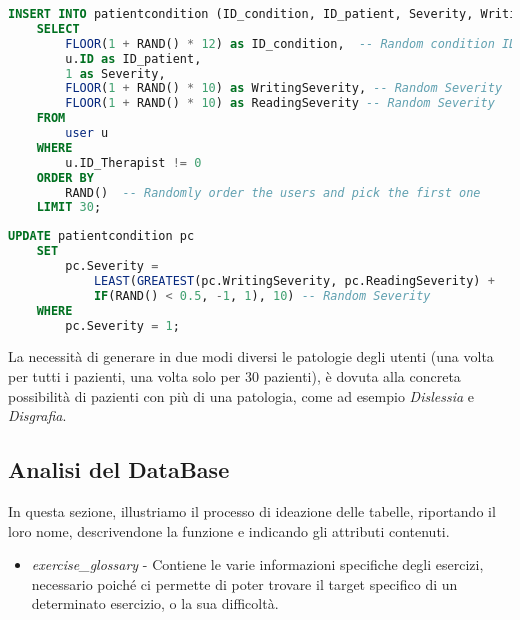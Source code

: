 \documentclass{article}
\begin{document}
    \begin{lstlisting}[language=SQL, caption=Generazione delle Writing e Reading severity (solo per 30 pazienti)]
    INSERT INTO patientcondition (ID_condition, ID_patient, Severity, WritingSeverity, ReadingSeverity)
    SELECT
        FLOOR(1 + RAND() * 12) as ID_condition,  -- Random condition ID (1 to 12)
        u.ID as ID_patient,
        1 as Severity,
        FLOOR(1 + RAND() * 10) as WritingSeverity, -- Random Severity
        FLOOR(1 + RAND() * 10) as ReadingSeverity -- Random Severity
    FROM
        user u
    WHERE
        u.ID_Therapist != 0
    ORDER BY
        RAND()  -- Randomly order the users and pick the first one
    LIMIT 30;
    \end{lstlisting}

    \begin{lstlisting}[language=SQL, caption=Generazione della General severity (tutti i pazienti)]
    UPDATE patientcondition pc
    SET
        pc.Severity =
            LEAST(GREATEST(pc.WritingSeverity, pc.ReadingSeverity) +
            IF(RAND() < 0.5, -1, 1), 10) -- Random Severity
    WHERE
        pc.Severity = 1;
    \end{lstlisting}

    La necessità di generare in due modi diversi le patologie degli utenti (una volta per tutti i pazienti, una volta solo per 30 pazienti), è dovuta alla concreta possibilità di pazienti con più di una patologia, come ad esempio \textit{Dislessia} e \textit{Disgrafia}.

    \pagebreak

    \subsection{Analisi del DataBase}
    In questa sezione, illustriamo il processo di ideazione delle tabelle, riportando il loro nome, descrivendone la funzione e indicando gli attributi contenuti.

\begin{itemize}
\item     \textit{exercise\_glossary} - Contiene le varie informazioni specifiche degli esercizi, necessario poiché ci permette di poter trovare il target specifico di un determinato esercizio, o la sua difficoltà.
\end{itemize}
\end{document}
